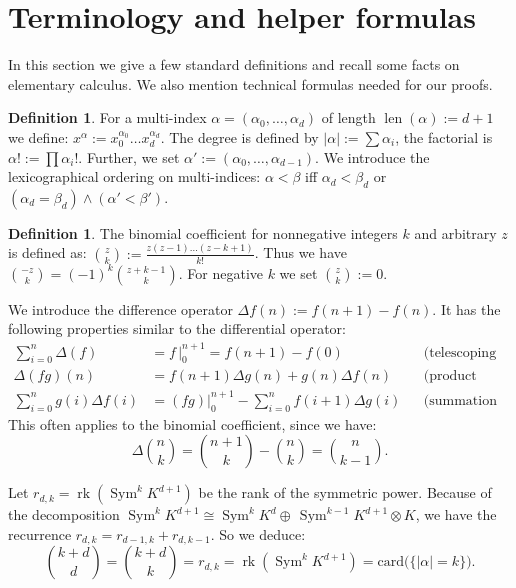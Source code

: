 \documentclass{amsart}
\DeclareMathOperator{\rank}{rk}
\DeclareMathOperator{\Sym}{Sym}
\DeclareMathOperator{\len}{len}
\newcommand{\coloneqq}{:=}
\theoremstyle{plain}
\theoremstyle{definition}
\newtheorem{definition}[theorem]{Definition}
\theoremstyle{remark}
\begin{document}
\section{Terminology and helper formulas} \label{boring}
In this section 
we give a few standard definitions and recall some facts on elementary calculus. We also mention technical formulas needed for our proofs.
\begin{definition}\label{multiindex}
For a multi-index $\alpha=(\alpha_0,\ldots,\alpha_d)$ of length $\len(\alpha)\coloneqq d+1$ we define: $x^\alpha \coloneqq x_0^{\alpha_0}\ldots x_d^{\alpha_d}$. The degree is defined by $|\alpha |\coloneqq\sum\alpha_i$, the factorial is $\alpha! \coloneqq \prod \alpha_i!$. Further, we set
$\alpha'\coloneqq(\alpha_0,\ldots,\alpha_{d-1})$. We introduce the lexicographical ordering on multi-indices: $\alpha < \beta$ iff $\alpha_d < \beta_d$ or $(\alpha_d=\beta_d) \wedge (\alpha'<\beta')$.
\end{definition}
\begin{definition}
The binomial coefficient for nonnegative integers $k$ and arbitrary $z$ is defined as:
$\binom{z}{k} \coloneqq \frac{z(z-1)\ldots(z-k+1)}{k!}$. Thus we have $\binom{-z}{k}=(-1)^k\binom{z+k-1}{k}$. For negative $k$ we set $\binom{z}{k}\coloneqq 0$.
\end{definition}
We introduce the difference operator $\Delta f(n) \coloneqq f(n+1)-f(n)$. It has the following properties similar to the differential operator:
\begin{align}
 \sum_{i=0}^n \Delta(f) & = f\,\Big|_0^{n+1}= f(n+1)-f(0) && \text{(telescoping sum)} \\
 \Delta (fg)(n) &= f(n+1) \Delta g(n) + g(n)\Delta f(n) &&\text{(product rule)} \\
\label{sumbyparts}  \sum_{i=0}^n g(i)\Delta f(i) & = (fg)\Big|_0^{n+1} - \sum_{i=0}^n f(i+1)\Delta g(i) && \text{(summation by parts)}
\end{align}
This often applies to the binomial coefficient, since we have: 
\begin{equation} \label{binomdiff}
\textstyle \Delta \binom{n}{k}=\binom{n+1}{k}-\binom{n}{k} = \binom{n}{k-1}.
\end{equation}

Let $r_{d,k} = \rank \left(\Sym^k K^{d+1} \right)$ be the rank of the symmetric power. 
Because of the decomposition $\Sym^k\! K^{d+1} \cong \Sym^k\! K^d \oplus \,\Sym^{k-1}\! K^{d+1}\!\otimes\! K$, we have the recurrence $r_{d,k} = r_{d-1,k} +r_{d,k-1}$. So we deduce:
\begin{equation} \label{binomcount} \textstyle
\binom{k+d}{d} =\binom{k+d}{k} = r_{d,k}=\rank \left(\Sym^k K^{d+1} \right) = \text{card}\big(\{|\alpha| =k\}\big).
\end{equation}
\end{document}
